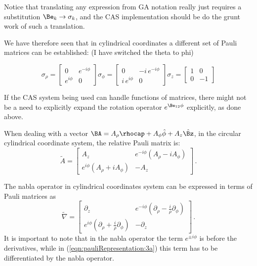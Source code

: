 Notice that translating any expression from GA notation really just requires a substitution \( \Be_k \rightarrow \sigma_k \), and the CAS implementation should be do the grunt work of such a translation.

We have therefore seen that in  cylindrical coordinates a different set of Pauli matrices can be established: (I have switched the theta to phi)

\begin{subequations}
\label{eqn:pauliRepresentation:1}
\begin{equation}\label{eqn:pauliRepresentation:cyl1}
\sigma_{\rho} =
\begin{bmatrix}
0 & e^{-i\phi} \\
e^{i\phi} & 0
\end{bmatrix}
\end{equation}
%
\begin{equation}\label{eqn:pauliRepresentation:cyl2}
\sigma_{\phi}
=
\begin{bmatrix}
0 & - i \, e^{-i\phi} \\
i \,e^{i\phi} & 0
\end{bmatrix}
\end{equation}
%
\begin{equation}\label{eqn:pauliRepresentation:cyl3}
\sigma_{z}
=
\begin{bmatrix}
1 & 0 \\
0 & -1
\end{bmatrix}
\end{equation}
\end{subequations}


If the CAS system being used can handle functions of matrices, there might not be a need to explicitly expand the rotation operator \( e^{\Be_{12} \phi } \) explicitly, as done above.

When dealing with a vector $\BA= A_{\rho}\rhocap + A_{\phi}\hat{\phi}  + A_z \hat{\Bz}$, in the circular cylindrical coordinate system, the relative Pauli matrix is: 
\begin{equation}\label{eqn:pauliRepresentation:3a}
\tilde{A }=
\begin{bmatrix}
A_z & e^{-i\phi}(A_{\rho} - i A_{\phi}) \\
e^{i\phi}(A_{\rho} + i A_{\phi}) & -A_z
\end{bmatrix} \, .
\end{equation}

The nabla operator in cylindrical coordinates system can be expressed in terms of Pauli matrices as
%
\begin{equation}\label{eqn:pauliRepresentation:3b}
\tilde{\nabla} =
\begin{bmatrix}
\partial_z & e^{-i\phi}(\partial_{\rho} - \frac {i}{\rho} \partial_{\phi}) \\
e^{i\phi}(\partial_{\rho} + \frac {i}{\rho} \partial_{\phi}) & -\partial_z
\end{bmatrix} \, .
\end{equation}
%
It is important to note that in the nabla operator the term $e^{\pm i\phi}$ is before the derivatives, while in (\ref{eqn:pauliRepresentation:3a}) this term has to be differentiated by the nabla operator.


